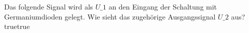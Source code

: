     {Das folgende Signal wird als $U\_1$ an den Eingang der Schaltung mit Germaniumdioden gelegt. Wie sieht das zugehörige Ausgangssignal $U\_2$ aus?}
    {}
    {}
    {}
    {}
    {true}{true}